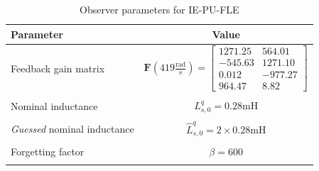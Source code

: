 \begin{table}[h]
\caption{Observer parameters for IE-PU-FLE}\label{Tab4.3}
\centering
\begin{tabular}{l c}
\hline
\textbf{Parameter} & \textbf{Value}  \\ \midrule
Feedback gain matrix & $\mathbf{F}(419\frac{\text{rad}}{\text{s}})=\begin{bmatrix}
    1271.25 & 564.01\\
    -545.63 & 1271.10\\
    0.012 & -977.27\\
    964.47 & 8.82
\end{bmatrix}$\\
\\
Nominal inductance & $L^{q}_{s,0}=0.28$mH\\
\\
\textit{Guessed} nominal inductance & $\hat{L} ^{q}_{s,0}= 2\times0.28$mH
\\
\\
Forgetting factor & $\beta = 600$
\\
\\
\hline
\end{tabular}
\end{table}
\newpage
